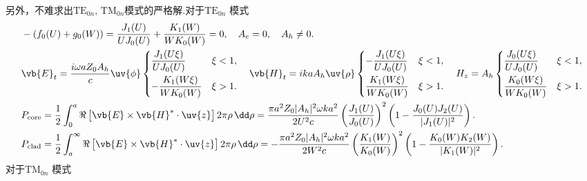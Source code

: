 另外，不难求出\(\mathrm{TE}_{0n},\,\mathrm{TM}_{0n}\)模式的严格解.对于\(\mathrm{TE}_{0n}\) 模式
\begin{align*}
	&-(f_0(U) + g_0(W)) = \dfrac{J_1(U)}{U J_0(U)} + \dfrac{K_1(W)}{W K_0(W)} = 0, \quad A_e = 0, \quad A_h \neq 0.\\
	&\vb{E}_t = \dfrac{i \omega a Z_0 A_h}{c} \uv{\phi}
	\begin{cases}
		\dfrac{J_1(U\xi)}{U J_0(U)}  & \xi < 1, \\[8pt]
		-\dfrac{K_1(W\xi)}{W K_0(W)} & \xi > 1.
	\end{cases}
	\quad
	\vb{H}_t = i k a A_h \uv{\rho}
	\begin{cases}
		-\dfrac{J_1(U\xi)}{U J_0(U)} & \xi < 1, \\[8pt]
		\dfrac{K_1(W\xi)}{W K_0(W)}  & \xi > 1.
	\end{cases}
	\quad
	H_z = A_h
	\begin{cases}
		\dfrac{J_0(U\xi)}{U J_0(U)} & \xi < 1, \\[8pt]
		\dfrac{K_0(W\xi)}{W K_0(W)} & \xi > 1.
	\end{cases}\\
	&P_{\text{core}} = \dfrac{1}{2} \int_0^a \Re\left[ \vb{E} \times \vb{H}^* \cdot \uv{z} \right] 2\pi \rho \, \dd \rho = \dfrac{\pi a^2 Z_0 |A_h|^2 \omega k a^2}{2 U^2 c} \left( \dfrac{J_1(U)}{J_0(U)} \right)^2 \left( 1 - \dfrac{J_0(U) J_2(U)}{|J_1(U)|^2} \right).\\
	&P_{\text{clad}} = \dfrac{1}{2} \int_a^\infty \Re\left[ \vb{E} \times \vb{H}^* \cdot \uv{z} \right] 2\pi \rho \, \dd \rho = -\dfrac{\pi a^2 Z_0 |A_h|^2 \omega k a^2}{2 W^2 c} \left( \dfrac{K_1(W)}{K_0(W)} \right)^2 \left( 1 - \dfrac{K_0(W) K_2(W)}{|K_1(W)|^2} \right).
\end{align*}
对于\(\mathrm{TM}_{0n}\) 模式

